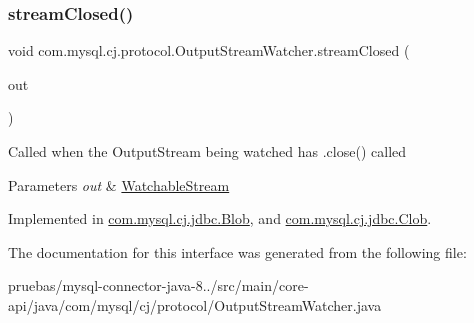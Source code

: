 \subsubsection{\texorpdfstring{stream\+Closed()}{streamClosed()}}
{\footnotesize\ttfamily void com.\+mysql.\+cj.\+protocol.\+Output\+Stream\+Watcher.\+stream\+Closed (\begin{DoxyParamCaption}\item[{\mbox{\hyperlink{interfacecom_1_1mysql_1_1cj_1_1protocol_1_1_watchable_stream}{Watchable\+Stream}}}]{out }\end{DoxyParamCaption})}

Called when the Output\+Stream being watched has .close() called


\begin{DoxyParams}{Parameters}
{\em out} & \mbox{\hyperlink{interfacecom_1_1mysql_1_1cj_1_1protocol_1_1_watchable_stream}{Watchable\+Stream}} \\
\hline
\end{DoxyParams}


Implemented in \mbox{\hyperlink{classcom_1_1mysql_1_1cj_1_1jdbc_1_1_blob_a891c76fb3123f5d9f736e05d50ed1fe8}{com.\+mysql.\+cj.\+jdbc.\+Blob}}, and \mbox{\hyperlink{classcom_1_1mysql_1_1cj_1_1jdbc_1_1_clob_afce3b43001378654ee8a1d99c8685eeb}{com.\+mysql.\+cj.\+jdbc.\+Clob}}.



The documentation for this interface was generated from the following file\+:\begin{DoxyCompactItemize}
\item 
pruebas/mysql-\/connector-\/java-\/8../src/main/core-\/api/java/com/mysql/cj/protocol/Output\+Stream\+Watcher.\+java\end{DoxyCompactItemize}
